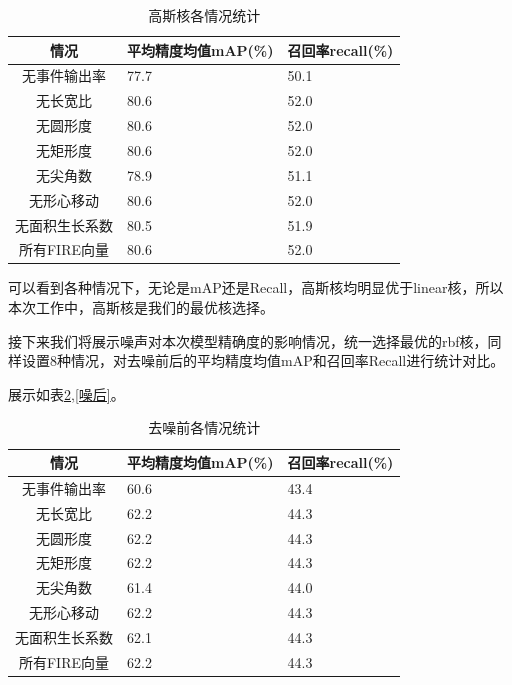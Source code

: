 \begin{table}[ht]
    \centering
    \caption{高斯核各情况统计}
    \begin{tabularx}{0.7\textwidth}{c|X|X}
        \toprule
        情况&平均精度均值mAP(\%)&召回率recall(\%)\\
        \midrule
        无事件输出率&77.7&50.1\\
        无长宽比&80.6&52.0\\
        无圆形度&80.6&52.0\\
        无矩形度&80.6&52.0\\
        无尖角数&78.9&51.1\\
        无形心移动&80.6&52.0\\
        无面积生长系数&80.5&51.9\\
        所有FIRE向量&80.6&52.0\\
        \bottomrule
    \end{tabularx}
    \label{rbf}
\end{table}

可以看到各种情况下，无论是mAP还是Recall，高斯核均明显优于linear核，所以本次工作中，高斯核是我们的最优核选择。

接下来我们将展示噪声对本次模型精确度的影响情况，统一选择最优的rbf核，同样设置8种情况，对去噪前后的平均精度均值mAP和召回率Recall进行统计对比。

展示如表\ref{噪前},\ref{噪后}。
\begin{table}[ht]
    \centering
    \caption{去噪前各情况统计}
    \begin{tabularx}{0.7\textwidth}{c|X|X}
        \toprule
        情况&平均精度均值mAP(\%)&召回率recall(\%)\\
        \midrule
        无事件输出率&60.6&43.4\\
        无长宽比&62.2&44.3\\
        无圆形度&62.2&44.3\\
        无矩形度&62.2&44.3\\
        无尖角数&61.4&44.0\\
        无形心移动&62.2&44.3\\
        无面积生长系数&62.1&44.3\\
        所有FIRE向量&62.2&44.3\\
        \bottomrule
    \end{tabularx}
    \label{噪前}
\end{table}


